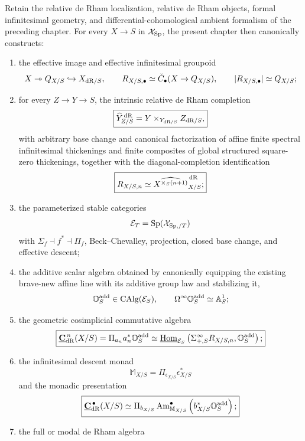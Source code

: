 \begin{theorem}
\label{thm:monadic-de-rham-package}
Retain the relative de Rham localization, relative de Rham objects, formal infinitesimal geometry,
and differential-cohomological ambient formalism of the preceding chapter.  For every
\(X\to S\) in \(\mathcal X_{\mathrm{Sp}}\), the present chapter then canonically constructs:
\begin{enumerate}
\item the effective image and effective infinitesimal groupoid
\[
    X\twoheadrightarrow Q_{X/S}\hookrightarrow X_{\mathrm{dR}/S},
    \qquad
    R_{X/S,\bullet}
    \simeq
    \check C_\bullet(X\to Q_{X/S}),
    \qquad
    |R_{X/S,\bullet}|\simeq Q_{X/S};
\]
\item for every \(Z\to Y\to S\), the intrinsic relative de Rham completion
\[
\boxed{
    \widehat Y^{\,\mathrm{dR}}_{Z/S}
    =
    Y\times_{Y_{\mathrm{dR}/S}}Z_{\mathrm{dR}/S},
}
\]
with arbitrary base change and canonical factorization of affine finite spectral infinitesimal
thickenings and finite composites of global structured square-zero thickenings, together with the
diagonal-completion identification
\[
\boxed{
    R_{X/S,n}
    \simeq
    \widehat{X^{\times_S(n+1)}}^{\,\mathrm{dR}}_{X/S};
}
\]
\item the parameterized stable categories
\[
    \mathcal E_T=\mathrm{Sp}(\mathcal X_{\mathrm{Sp},/T})
\]
with \(\Sigma_f\dashv f^*\dashv\Pi_f\), Beck--Chevalley, projection, closed base change, and effective
descent;
\item the additive scalar algebra obtained by canonically equipping the existing brave-new affine line
with its additive group law and stabilizing it,
\[
    \mathbb O_S^{\mathrm{add}}\in\operatorname{CAlg}(\mathcal E_S),
    \qquad
    \Omega^\infty\mathbb O_S^{\mathrm{add}}\simeq\mathbb A^1_S;
\]
\item the geometric cosimplicial commutative algebra
\[
\boxed{
    \underline{\mathbf C}_{\mathrm{dR}}^{\,n}(X/S)
    =
    \Pi_{a_n}a_n^*\mathbb O_S^{\mathrm{add}}
    \simeq
    \underline{\operatorname{Hom}}_{\mathcal E_S}
    \left(
        \Sigma^\infty_{+,S}R_{X/S,n},
        \mathbb O_S^{\mathrm{add}}
    \right);
}
\]
\item the infinitesimal descent monad
\[
    \mathbb M_{X/S}=\Pi_{\epsilon_{X/S}}\epsilon_{X/S}^*
\]
and the monadic presentation
\[
\boxed{
    \underline{\mathbf C}_{\mathrm{dR}}^{\,\bullet}(X/S)
    \simeq
    \Pi_{b_{X/S}}
    \operatorname{Am}_{\mathbb M_{X/S}}^\bullet
    \left(
        b_{X/S}^*\mathbb O_S^{\mathrm{add}}
    \right);
}
\]
\item the full or modal de Rham algebra

\end{enumerate}
\end{theorem}
